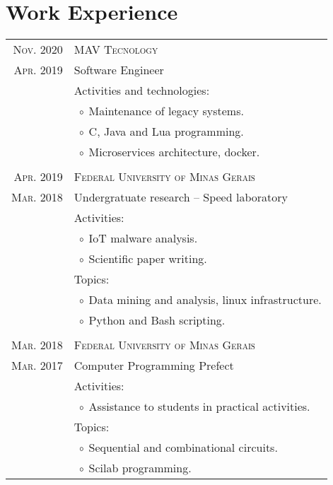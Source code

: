 \documentclass[a4paper,10pt]{article}
\newcommand{\tabitem}{$\;\circ\;$}
\newcommand{\cpp}{C\protect\scalebox{0.8}{\protect\raisebox{0.4ex}{++}}}
\renewcommand\#{\protect\scalebox{0.8}{\protect\raisebox{0.4ex}{\char"0023}}}
\begin{document}
\section{Work Experience}
\begin{tabular}{r|p{12.3cm}}
  \textsc{Nov. 2020} & \textsc{MAV Tecnology} \\
  \textsc{Apr. 2019} & Software Engineer \\[5pt]
  & Activities and technologies: \\
  & \tabitem Maintenance of legacy systems. \\
  & \tabitem \cpp, Java and Lua programming. \\
  & \tabitem Microservices architecture, docker. \\

  \multicolumn{2}{c}{} \\
  \textsc{Apr. 2019} & \textsc{Federal University of Minas Gerais} \\
  \textsc{Mar. 2018} & Undergratuate research -- Speed laboratory \\[5pt]
  & Activities: \\
  & \tabitem IoT malware analysis. \\
  & \tabitem Scientific paper writing. \\
  & Topics: \\
  & \tabitem Data mining and analysis, linux infrastructure. \\
  & \tabitem Python and Bash scripting. \\

  \multicolumn{2}{c}{} \\
  \textsc{Mar. 2018} & \textsc{Federal University of Minas Gerais} \\
  \textsc{Mar. 2017} & Computer Programming Prefect \\[5pt]
  & Activities: \\
  & \tabitem Assistance to students in practical activities. \\
  & Topics: \\
  & \tabitem Sequential and combinational circuits. \\
  & \tabitem Scilab programming. \\
  

\end{tabular}
\end{document}
